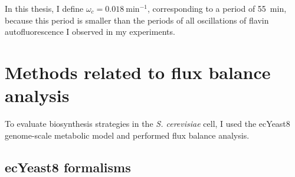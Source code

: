 In this thesis, I define $\omega_{c} = \SI{0.018}{\minute^{-1}}$, corresponding to a period of \SI{55}{\minute}, because this period is smaller than the periods of all oscillations of flavin autofluorescence I observed in my experiments.


\section{Methods related to flux balance analysis}
\label{sec:methods-fba}

To evaluate biosynthesis strategies in the \textit{S. cerevisiae} cell, I used the ecYeast8 \parencite{luConsensusCerevisiaeMetabolic2019} genome-scale metabolic model and performed flux balance analysis.

\subsection{ecYeast8 formalisms}
\label{subsec:methods-fba-ecYeast8}

